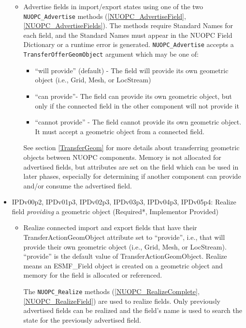 \begin{itemize}
  \begin{itemize}
  \item Advertise fields in import/export states using one of the two {\tt NUOPC\_Advertise} methods (\ref{NUOPC_AdvertiseField}, \ref{NUOPC_AdvertiseFields}). The methods require Standard Names for each field, and the Standard Names must appear in the NUOPC Field Dictionary or a runtime error is generated.  {\tt NUOPC\_Advertise} accepts a {\tt TransferOfferGeomObject} argument which may be one of:
    \begin{itemize}
    \item ``will provide'' (default) - The field will provide its own geometric object (i.e., Grid, Mesh, or LocStream)
    \item ``can provide''- The field can provide its own geometric object, but only if the connected field in the other component will not provide it
    \item ``cannot provide'' - The field cannot provide its own geometric object. It must accept a geometric object from a connected field.
    \end{itemize}
  See section \ref{TransferGeom} for more details about transferring geometric objects between NUOPC components.
  Memory is not allocated for advertised fields, but attributes are set on the field which can be used in later phases, especially for determining if another component can provide and/or consume the advertised field.
  \end{itemize}
\item IPDv00p2, IPDv01p3, IPDv02p3, IPDv03p3, IPDv04p3, IPDv05p4: Realize field {\em providing} a geometric object ({\sc Required*, Implementor Provided})
  \begin{itemize}
  \item Realize connected import and export fields that have their TransferActionGeomObject attribute set to ``provide'', i.e., that will provide their own geometric object (i.e., Grid, Mesh, or LocStream). ``provide'' is the default value of TransferActionGeomObject. Realize means an ESMF\_Field object is created on a geometric object and memory for the field is allocated or referenced.

The {\tt NUOPC\_Realize} methods (\ref{NUOPC_RealizeComplete}, \ref{NUOPC_RealizeField}) are used to realize fields. Only previously advertised fields can be realized and the field's name is used to search the state for the previously advertised field.


\end{itemize}
\end{itemize}
